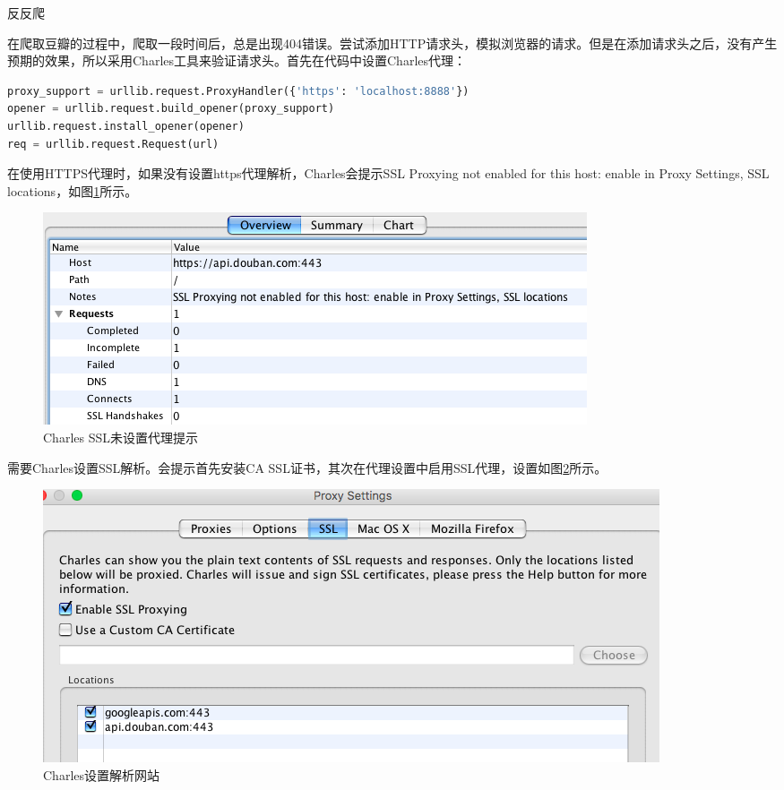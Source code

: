 \documentclass[8pt]{book}
\makeatletter
\numberwithin{dummy}{section}
\theoremstyle{ocrenumbox}
\theoremstyle{blacknumex}
\theoremstyle{blacknumbox}
\theoremstyle{ocrenum}
\renewcommand{\subsection}{\@startsection {subsection}{2}{\z@}
	{-3ex \@plus -0.1ex \@minus -.4ex}
	{0.5ex \@plus.2ex }
	{\normalfont\sffamily\bfseries}}
\newlength\esp
\makeatother
\begin{document}
\subsection{反反爬}

在爬取豆瓣的过程中，爬取一段时间后，总是出现404错误。尝试添加HTTP请求头，模拟浏览器的请求。但是在添加请求头之后，没有产生预期的效果，所以采用Charles工具来验证请求头。首先在代码中设置Charles代理：

\begin{lstlisting}[language=Python]
proxy_support = urllib.request.ProxyHandler({'https': 'localhost:8888'})
opener = urllib.request.build_opener(proxy_support)
urllib.request.install_opener(opener)
req = urllib.request.Request(url)
\end{lstlisting}

在使用HTTPS代理时，如果没有设置https代理解析，Charles会提示SSL Proxying not enabled for this host: enable in Proxy Settings, SSL locations，如图\ref{fig:charlesssltips}所示。

\begin{figure}[htbp]
	\centering
	\includegraphics[scale=0.6]{charlesssltips.png}
	\caption{Charles SSL未设置代理提示}
	\label{fig:charlesssltips}
\end{figure}

需要Charles设置SSL解析。会提示首先安装CA SSL证书，其次在代理设置中启用SSL代理，设置如图\ref{fig:httpcharlesparse}所示。

\begin{figure}[htbp]
	\centering
	\includegraphics[scale=0.5]{httpcharlesparse.png}
	\caption{Charles设置解析网站}
	\label{fig:httpcharlesparse}
\end{figure}
\end{document}
